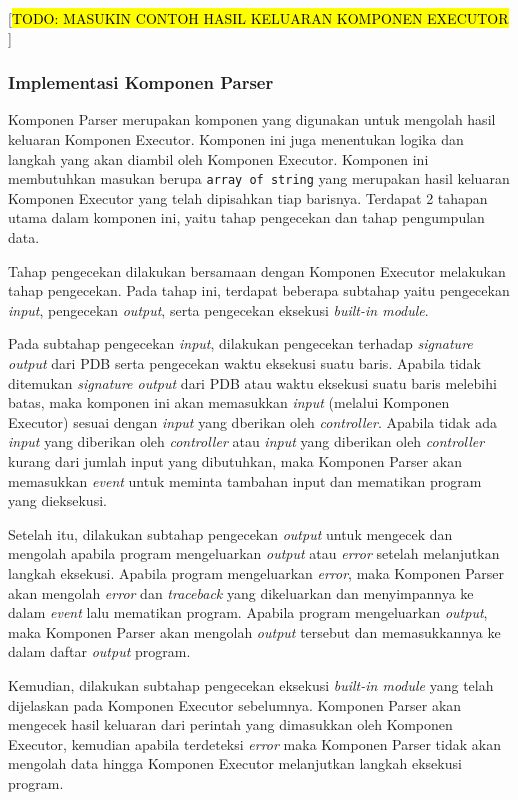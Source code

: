   [\hl{TODO: MASUKIN CONTOH HASIL KELUARAN KOMPONEN EXECUTOR }]

\subsubsection{Implementasi Komponen Parser}
Komponen Parser merupakan komponen yang digunakan untuk mengolah hasil keluaran Komponen Executor. Komponen ini juga menentukan logika dan langkah yang akan diambil oleh Komponen Executor. Komponen ini membutuhkan masukan berupa \verb|array of string| yang merupakan hasil keluaran Komponen Executor yang telah dipisahkan tiap barisnya. Terdapat 2 tahapan utama dalam komponen ini, yaitu tahap pengecekan dan tahap pengumpulan data.

Tahap pengecekan dilakukan bersamaan dengan Komponen Executor melakukan tahap pengecekan. Pada tahap ini, terdapat beberapa subtahap yaitu pengecekan \textit{input}, pengecekan \textit{output}, serta pengecekan eksekusi \textit{built-in module}.

Pada subtahap pengecekan \textit{input}, dilakukan pengecekan terhadap \textit{signature output} dari PDB serta pengecekan waktu eksekusi suatu baris. Apabila tidak ditemukan \textit{signature output} dari PDB atau waktu eksekusi suatu baris melebihi batas, maka komponen ini akan memasukkan \textit{input} (melalui Komponen Executor) sesuai dengan \textit{input} yang dberikan oleh \textit{controller}. Apabila tidak ada \textit{input} yang diberikan oleh \textit{controller} atau \textit{input} yang diberikan oleh \textit{controller} kurang dari jumlah input yang dibutuhkan, maka Komponen Parser akan memasukkan \textit{event} untuk meminta tambahan input dan mematikan program yang dieksekusi.

Setelah itu, dilakukan subtahap pengecekan \textit{output} untuk mengecek dan mengolah apabila program mengeluarkan \textit{output} atau \textit{error} setelah melanjutkan langkah eksekusi. Apabila program mengeluarkan \textit{error}, maka Komponen Parser akan mengolah \textit{error} dan \textit{traceback} yang dikeluarkan dan menyimpannya ke dalam \textit{event} lalu mematikan program. Apabila program mengeluarkan \textit{output}, maka Komponen Parser akan mengolah \textit{output} tersebut dan memasukkannya ke dalam daftar \textit{output} program.

Kemudian, dilakukan subtahap pengecekan eksekusi \textit{built-in module} yang telah dijelaskan pada Komponen Executor sebelumnya. Komponen Parser akan mengecek hasil keluaran dari perintah yang dimasukkan oleh Komponen Executor, kemudian apabila terdeteksi \textit{error} maka Komponen Parser tidak akan mengolah data hingga Komponen Executor melanjutkan langkah eksekusi program.

